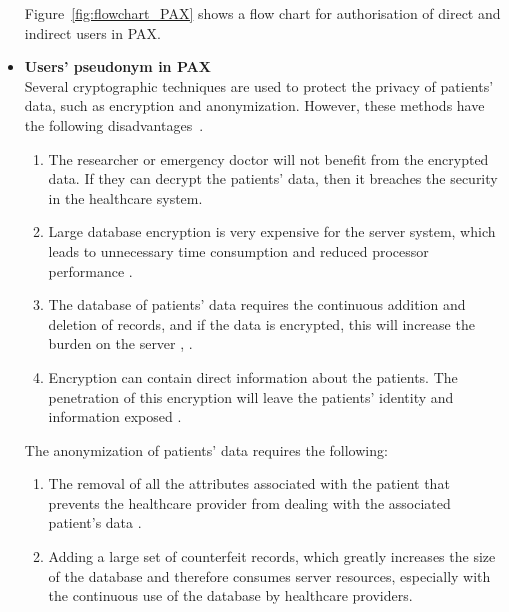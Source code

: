 \documentclass[journal,article,submit,moreauthors,pdftex]{Definitions/mdpi}
\begin{document}
\begin{itemize}
Figure~\ref{fig:flowchart_PAX} shows a flow chart for authorisation of direct and indirect users in PAX.
\item \textbf{Users' pseudonym in PAX}\\
Several cryptographic techniques are used to protect the privacy of patients' data, such as encryption and anonymization. However, these methods have the following disadvantages~\cite{fp3}.
\begin{enumerate}
\item The researcher or emergency doctor will not benefit from the encrypted data.
If they can decrypt the patients' data, then it breaches the security in the
healthcare system.
\item Large database encryption is very expensive for the server system, which leads to unnecessary time consumption and reduced processor performance \cite{fp54}.
\item The database of patients' data requires the continuous addition and deletion of records, and if the data is encrypted, this will increase the burden on the server \cite{fp52}, \cite{fp53}.
\item Encryption can contain direct information about the patients. The penetration of this encryption will leave the patients' identity and information exposed \cite{fp51}.
\end{enumerate}
The anonymization of patients' data requires the following:
\begin{enumerate}
\item The removal of all the attributes associated with the patient that prevents the healthcare provider from dealing with the associated patient's data \cite{fp3}.
\item Adding a large set of counterfeit records, which greatly increases the size of the database and therefore consumes server resources, especially with the continuous use of the database by healthcare providers.
\end{enumerate}


\end{itemize}
\end{document}
